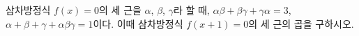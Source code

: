 삼차방정식 $f(x)=0$의 세 근을 $\alpha$, $\beta$, $\gamma$라 할 때, $\alpha\beta+\beta\gamma+\gamma\alpha=3$, $\alpha+\beta+\gamma+\alpha\beta\gamma=1$이다. 이때 삼차방정식 $f(x+1)=0$의 세 근의 곱을 구하시오.

